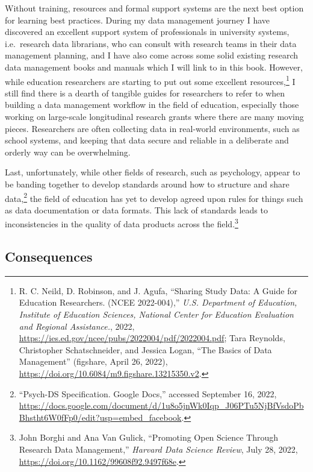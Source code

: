 \documentclass[
]{book}
\begin{document}
Without training, resources and formal support systems are the next best option for learning best practices. During my data management journey I have discovered an excellent support system of professionals in university systems, i.e.~research data librarians, who can consult with research teams in their data management planning, and I have also come across some solid existing research data management books and manuals which I will link to in this book. However, while education researchers are starting to put out some excellent resources,\footnote{R. C. Neild, D. Robinson, and J. Agufa, {``Sharing Study Data: A Guide for Education Researchers. ({NCEE} 2022-004),''} \emph{U.S. Department of Education, Institute of Education Sciences, National Center for Education Evaluation and Regional Assistance.}, 2022, \url{https://ies.ed.gov/ncee/pubs/2022004/pdf/2022004.pdf}; Tara Reynolds, Christopher Schatschneider, and Jessica Logan, {``The Basics of Data Management''} (figshare, April 26, 2022), \url{https://doi.org/10.6084/m9.figshare.13215350.v2}.} I still find there is a dearth of tangible guides for researchers to refer to when building a data management workflow in the field of education, especially those working on large-scale longitudinal research grants where there are many moving pieces. Researchers are often collecting data in real-world environments, such as school systems, and keeping that data secure and reliable in a deliberate and orderly way can be overwhelming.

Last, unfortunately, while other fields of research, such as psychology, appear to be banding together to develop standards around how to structure and share data,\footnote{{``Psych-{DS} Specification. Google Docs,''} accessed September 16, 2022, \url{https://docs.google.com/document/d/1u8o5jnWk0Iqp_J06PTu5NjBfVsdoPbBhstht6W0fFp0/edit?usp=embed_facebook}.} the field of education has yet to develop agreed upon rules for things such as data documentation or data formats. This lack of standards leads to inconsistencies in the quality of data products across the field.\footnote{John Borghi and Ana Van Gulick, {``Promoting Open Science Through Research Data Management,''} \emph{Harvard Data Science Review}, July 28, 2022, \url{https://doi.org/10.1162/99608f92.9497f68e}.}

\hypertarget{consequences}{%
\subsection{Consequences}\label{consequences}}
\end{document}
